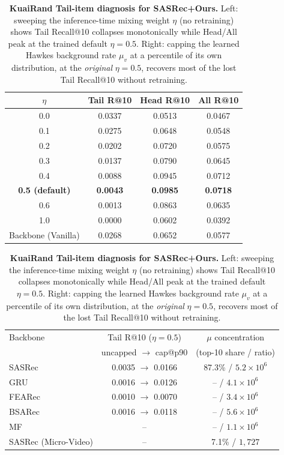\begin{table}[t]
\centering
\caption{\textbf{KuaiRand Tail-item diagnosis for SASRec+Ours.} Left: sweeping the
inference-time mixing weight $\eta$ (no retraining) shows Tail Recall@10 collapses
monotonically while Head/All peak at the trained default $\eta=0.5$. Right: capping the
learned Hawkes background rate $\mu_v$ at a percentile of its own distribution, at the
\emph{original} $\eta=0.5$, recovers most of the lost Tail Recall@10 without retraining.}
\label{tab:kuairand_tail_diagnosis}
\begin{tabular}{c ccc}
\toprule
$\eta$ & Tail R@10 & Head R@10 & All R@10 \\
\midrule
0.0 & 0.0337 & 0.0513 & 0.0467 \\
0.1 & 0.0275 & 0.0648 & 0.0548 \\
0.2 & 0.0202 & 0.0720 & 0.0575 \\
0.3 & 0.0137 & 0.0790 & 0.0645 \\
0.4 & 0.0088 & 0.0945 & 0.0712 \\
\textbf{0.5 (default)} & \textbf{0.0043} & \textbf{0.0985} & \textbf{0.0718} \\
0.6 & 0.0013 & 0.0863 & 0.0635 \\
1.0 & 0.0000 & 0.0602 & 0.0392 \\
\midrule
Backbone (Vanilla) & 0.0268 & 0.0652 & 0.0577 \\
\bottomrule
\end{tabular}
\hfill
\begin{tabular}{l cc}
\toprule
Backbone & Tail R@10 ($\eta=0.5$) & $\mu$ concentration \\
 & uncapped $\to$ cap@p90 & (top-10 share / ratio) \\
\midrule
SASRec & 0.0035 $\to$ 0.0166 & 87.3\% / $5.2{\times}10^6$ \\
GRU & 0.0016 $\to$ 0.0126 & -- / $4.1{\times}10^6$ \\
FEARec & 0.0010 $\to$ 0.0070 & -- / $3.4{\times}10^6$ \\
BSARec & 0.0016 $\to$ 0.0118 & -- / $5.6{\times}10^6$ \\
MF & -- & -- / $1.1{\times}10^6$ \\
\midrule
SASRec (Micro-Video) & -- & 7.1\% / $1{,}727$ \\
\bottomrule
\end{tabular}
\end{table}

